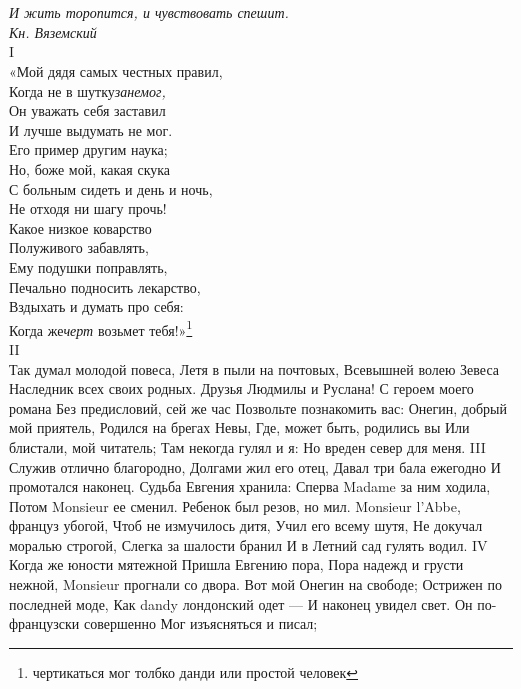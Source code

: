 \chapter{} %
\label{cap1} %

\textit{И жить торопится, и чувствовать спешит.\\
Кн. Вяземский}\\

I\\
«Мой дядя самых честных правил,\\
Когда не в шутку\emph{занемог,}\\
Он уважать себя заставил\\
И лучше выдумать не мог.\\
Его пример другим наука;\\
Но, боже мой, какая скука\\
С больным сидеть и день и ночь,\\
Не отходя ни шагу прочь!\\
Какое низкое коварство\\
Полуживого забавлять,\\
Ему подушки поправлять,\\
Печально подносить лекарство,\\
Вздыхать и думать про себя:\\
Когда же\emph{черт} возьмет тебя!»\footnote{чертикаться мог толбко данди или простой человек}\\
II\\
Так думал молодой повеса,
Летя в пыли на почтовых,
Всевышней волею Зевеса
Наследник всех своих родных.
Друзья Людмилы и Руслана!
С героем моего романа
Без предисловий, сей же час
Позвольте познакомить вас:
Онегин, добрый мой приятель,
Родился на брегах Невы,
Где, может быть, родились вы
Или блистали, мой читатель;
Там некогда гулял и я:
Но вреден север для меня.
III
Служив отлично благородно,
Долгами жил его отец,
Давал три бала ежегодно
И промотался наконец.
Судьба Евгения хранила:
Сперва Madame за ним ходила,
Потом Monsieur ее сменил.
Ребенок был резов, но мил.
Monsieur l’Abbe, француз убогой,
Чтоб не измучилось дитя,
Учил его всему шутя,
Не докучал моралью строгой,
Слегка за шалости бранил
И в Летний сад гулять водил.
IV
Когда же юности мятежной
Пришла Евгению пора,
Пора надежд и грусти нежной,
Monsieur прогнали со двора.
Вот мой Онегин на свободе;
Острижен по последней моде,
Как dandy лондонский одет —
И наконец увидел свет.
Он по-французски совершенно
Мог изъясняться и писал;

